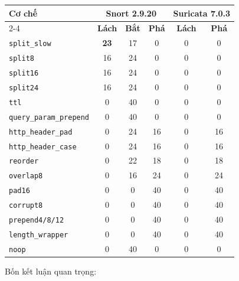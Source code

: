 \documentclass[12pt, a4paper, openany]{book}
\begin{document}
\begin{center}
\begin{tabular}{|l|c|c|c|c|c|}
\hline
\textbf{Cơ chế} & \multicolumn{3}{c|}{\textbf{Snort 2.9.20}} & \multicolumn{2}{c}{\textbf{Suricata 7.0.3}} \\
\cline{2-4}\cline{5-6}
 & \textbf{Lách} & \textbf{Bắt} & \textbf{Phá} & \textbf{Lách} & \textbf{Phá} \\
\hline
\texttt{split\_slow}     & \textbf{23} & 17 & 0  & 0 & 0 \\
\texttt{split8}         & 16 & 24 & 0  & 0 & 0 \\
\texttt{split16}        & 16 & 24 & 0  & 0 & 0 \\
\texttt{split24}        & 16 & 24 & 0  & 0 & 0 \\
\texttt{ttl}            & 0  & 40 & 0  & 0 & 0 \\
\texttt{query\_param\_prepend} & 0 & 40 & 0 & 0 & 0 \\
\texttt{http\_header\_pad} & 0 & 24 & 16 & 0 & 16 \\
\texttt{http\_header\_case} & 0 & 24 & 16 & 0 & 16 \\
\texttt{reorder}        & 0  & 22 & 18 & 0 & 18 \\
\texttt{overlap8}       & 0  & 16 & 24 & 0 & 24 \\
\texttt{pad16}          & 0  & 0  & 40 & 0 & 40 \\
\texttt{corrupt8}       & 0  & 0  & 40 & 0 & 40 \\
\texttt{prepend4/8/12}  & 0  & 0  & 40 & 0 & 40 \\
\texttt{length\_wrapper} & 0 & 0  & 40 & 0 & 40 \\
\texttt{noop}           & 0  & 40 & 0  & 0 & 0 \\
\hline
\end{tabular}
\end{center}

Bốn kết luận quan trọng:
\end{document}
